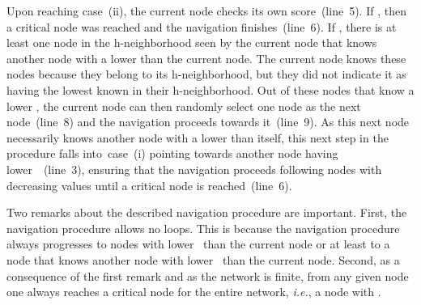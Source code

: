 \documentclass[conference,fleqn]{IEEEtran}
\newcommand{\art}[1]{\textcolor{blue}{\bf [Artur]: #1}}
\begin{document}
Upon reaching case~(ii), the current node checks its own  score~(line~5). If ,
then a critical node was reached and the navigation finishes~(line~6). If , there is at least one node in
the h-neighborhood seen by the current node that knows another node with a lower  than the current node.
The current node knows these nodes because they belong to its h-neighborhood, but they did not indicate it as having
the lowest  known  in their h-neighborhood. Out of these nodes that know a lower ,
the current node can then randomly select one node as the next node~(line~8) and the navigation
proceeds towards it~(line~9). As this next node necessarily knows another node with a lower  than itself,
this next step in the procedure falls into~case~(i) pointing towards another node having lower~~(line~3),
ensuring that the navigation proceeds following nodes with decreasing  values until
a critical node is reached~(line~6).

Two remarks about the described navigation procedure are important. First, the navigation procedure allows no loops. This is because
the navigation procedure always progresses to nodes with lower~ than the current node or at least to a node that knows another
node with lower~ than the current node. Second, as a consequence of the first remark and as the network is finite, from
any given node one always reaches a critical node for the entire network, \textit{i.e.}, a node with . 
\begin{comment}
\art{In other words, 
from the described navigation procedure, each node in the network is associated to one and only one critical node. 
Since each node is associated to one and only one critical node, this association relationship creates a \emph{partition} in the network.
Exploring the possibility of using the proposed methodology as a network partitioning technique is however out of scope of this paper and 
left for future work~(see Section~\ref{sec:Conc} for further discussion).}
\end{comment}

\begin{algorithm}[t]
\footnotesize
\caption{}
\label{alg:nav}
\begin{algorithmic}[1]

\REQUIRE 
\ENSURE  
\STATE 
{} 
	\RETURN 
{} 
	\IF{}
		\RETURN  {}
	\ELSE
		\STATE 
		\RETURN 
	\ENDIF
\ENDIF
\end{algorithmic}
\normalsize
\end{algorithm}
\end{document}
